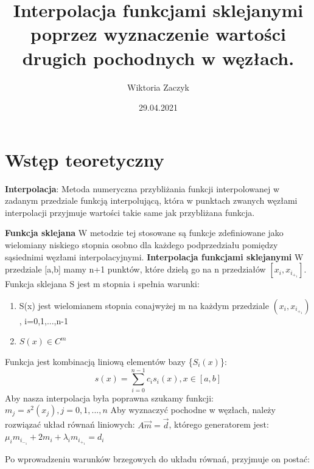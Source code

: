 \documentclass{article}
\title{Interpolacja funkcjami sklejanymi poprzez wyznaczenie
wartości drugich pochodnych w węzłach.
}
\author{Wiktoria Zaczyk}
\date{29.04.2021}
\begin{document}
\maketitle

\section{Wstęp teoretyczny}

\newline\newline
\textbf{Interpolacja}:
\newline
Metoda numeryczna przybliżania funkcji interpolowanej w zadanym przedziale 
funkcją interpolującą, która w punktach zwanych węzłami interpolacji przyjmuje wartości takie 
same jak przybliżana funkcja.
\newline

\textbf{Funkcja sklejana}
\newline
W metodzie tej stosowane są funkcje zdefiniowane jako wielomiany niskiego stopnia osobno dla każdego podprzedziału pomiędzy sąsiednimi węzłami interpolacyjnymi. 
\newline\newline
\textbf{Interpolacja funkcjami sklejanymi}
W przedziale [a,b] mamy n+1 punktów, które dzielą go na n przedziałów $[x_i, x_i_+_1]$. Funkcja sklejana S jest m stopnia i spełnia warunki: 

\begin{enumerate}
\item S(x) jest wielomianem stopnia conajwyżej m na każdym przedziale $(x_i, x_i_+_1)$, i=0,1,...,n-1
\item $S(x) \in C^m$
\end{enumerate}
Funkcja jest kombinacją liniową elementów bazy \{$S_i(x)$\}:  \[ s(x)= \sum_{i=0}^{n-1} c_is_i(x), x \in [a,b] \]
Aby nasza interpolacja była poprawna szukamy funkcji: 
\newline
$m_j=s^2(x_j), j=0,1,...,n$
\newline\newline
Aby wyznaczyć pochodne w węzłach, należy rozwiązać układ równań liniowych: $A \overrightarrow{m} = \overrightarrow{d}$, którego generatorem jest: $\mu_i m_i_-_1+2m_i +\lambda_im_i_+_1=d_i$
\newline

Po wprowadzeniu warunków brzegowych do układu równań, przyjmuje on postać:
\end{document}
